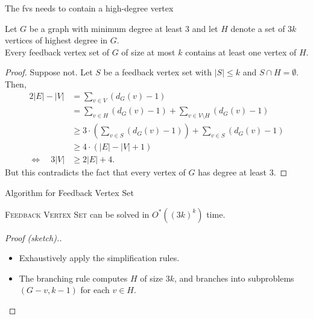 \begin{frame}{The fvs needs to contain a high-degree vertex}
 \begin{lemma}
  Let $G$ be a graph with minimum degree at least 3 and let $H$ denote a set of $3k$ vertices of highest degree in $G$.\\
  Every feedback vertex set of $G$ of size at most $k$ contains at least one vertex of $H$.
 \end{lemma}
 \pause
 \begin{proof}\slides{\small}
  Suppose not. Let $S$ be a feedback vertex set with $|S|\le k$ and $S\cap H = \emptyset$.
  Then,
  \begin{align*}
   2|E|-|V| &= \sum_{v\in V} (d_G(v)-1)\\
            &= \sum_{v\in H} (d_G(v)-1) + \sum_{v\in V\setminus H} (d_G(v)-1)\\
            &\ge 3\cdot ( \sum_{v\in S} (d_G(v)-1) ) + \sum_{v\in S} (d_G(v)-1)\\
            &\ge 4\cdot ( |E|-|V|+1)\\
  \Leftrightarrow \quad 3|V| &\ge 2|E|+4.
  \end{align*}
  But this contradicts the fact that every vertex of $G$ has degree at least $3$.
 \end{proof}

\end{frame}


\begin{frame}{Algorithm for Feedback Vertex Set}
 
 \begin{theorem}
  \textsc{Feedback Vertex Set} can be solved in $O^*((3k)^k)$ time.
 \end{theorem}
 \begin{proof}[Proof (sketch).]
  \begin{itemize}
   \item Exhaustively apply the simplification rules.
   \item The branching rule computes $H$ of size $3k$, and branches into subproblems $(G-v,k-1)$ for each $v\in H$.
  \end{itemize}

 \end{proof}
 


\end{frame}

